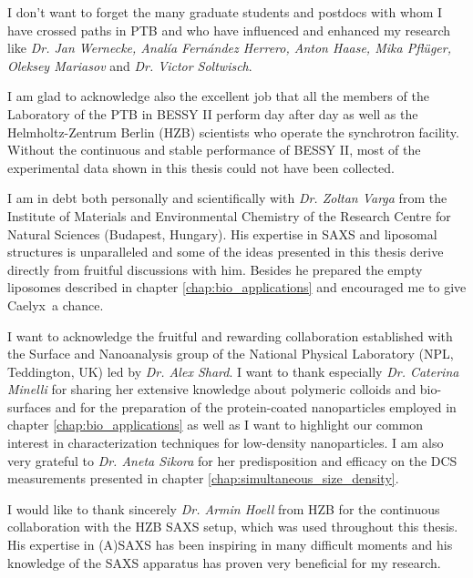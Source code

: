 \noindent I don't want to forget the many graduate students and postdocs with whom I have crossed paths in PTB and who have influenced and enhanced my research like \emph{Dr. Jan Wernecke, Anal\'{i}a Fern\'{a}ndez Herrero, Anton Haase, Mika Pflüger, Oleksey Mariasov} and \emph{Dr. Victor Soltwisch}.
\vspace{2ex}

\noindent I am glad to acknowledge also the excellent job that all the members of the Laboratory of the PTB in BESSY II perform day after day as well as the Helmholtz-Zentrum Berlin (HZB) scientists who operate the synchrotron facility. Without the continuous and stable performance of BESSY II, most of the experimental data shown in this thesis could not have been collected.
\vspace{2ex}

\noindent I am in debt both personally and scientifically with \emph{Dr. Zoltan Varga} from the Institute of Materials and Environmental Chemistry of the Research Centre for Natural Sciences (Budapest, Hungary). His expertise in SAXS and liposomal structures is unparalleled and some of the ideas presented in this thesis derive directly from fruitful discussions with him. Besides he prepared the empty liposomes described in chapter \ref{chap:bio_applications} and encouraged me to give Caelyx\textregistered\ a chance.

\vspace{2ex}

\noindent I want to acknowledge the fruitful and rewarding collaboration established with the Surface and Nanoanalysis group of the National Physical Laboratory (NPL, Teddington, UK) led by \emph{Dr. Alex Shard}. I want to thank especially \emph{Dr. Caterina Minelli} for sharing her extensive knowledge about polymeric colloids and bio-surfaces and for the preparation of the protein-coated nanoparticles employed in chapter \ref{chap:bio_applications} as well as I want to highlight our common interest in characterization techniques for low-density nanoparticles. I am also very grateful to \emph{Dr. Aneta Sikora} for her predisposition and efficacy on the DCS measurements presented in chapter \ref{chap:simultaneous_size_density}.
\vspace{2ex}

\noindent I would like to thank sincerely \emph{Dr. Armin Hoell} from HZB for the continuous collaboration with the HZB SAXS setup, which was used throughout this thesis. His expertise in (A)SAXS has been inspiring in many difficult moments and his knowledge of the SAXS apparatus has proven very beneficial for my research.
\vspace{2ex}

